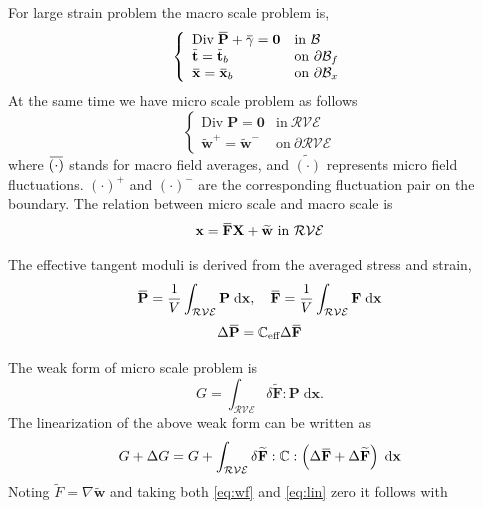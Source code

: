 \documentclass[10pt,a4paper]{scrreprt}
\newcommand{\myd}{\;\mathrm{d}}
\newcommand{\overbar}[1]{\mkern 1.5mu\overline{\mkern-1.5mu#1\mkern-1.5mu}\mkern 1.5mu}
\begin{document}
For large strain problem the macro scale problem is, 
\begin{equation}
\label{eq:macro}
\left\{
\begin{array}{ll}
\textrm{Div} \; \overbar{\mathbf{P}} + \overbar{\mathbf{\gamma}} = \mathbf{0} & \text{in} \ \mathcal{B} \\
\overbar{\mathbf{t}} = \overbar{\mathbf{t}}_{b} & \text{on} \ \partial \mathcal{B}_{f} 
\\
\overbar{\mathbf{x}} = \overbar{\mathbf{x}}_{b} & \text{on} \ \partial \mathcal{B}_{x} 
\end{array}
\right.
\end{equation}
At the same time we have micro scale problem as follows
\begin{equation}
\left\{
\begin{array}{ll}
\textrm{Div} \; \mathbf{P} = \mathbf{0} & \text{in} \ \mathcal{RVE} \\
\widetilde{\mathbf{w}}^{+} = \widetilde{\mathbf{w}}^{-} & \text{on} \ \partial \mathcal{RVE} 
\end{array}
\right.
\end{equation}
where $\overbar{(\cdot)}$ stands for macro field averages, and $\widetilde{(\cdot)}$ represents micro field fluctuations. $(\cdot)^{+}$ and $(\cdot)^{-}$ are the corresponding fluctuation pair on the boundary. The relation between micro scale and macro scale is 
\begin{equation}
\mathbf{x} = \overbar{\mathbf{F}} \mathbf{X} + \widetilde{\mathbf{w}} \ \text{in} \ \mathcal{RVE}
\end{equation}

The effective tangent moduli is derived from the averaged stress and strain,
\begin{equation}
\label{eq:avg}
\overbar{\mathbf{P}} = \dfrac{1}{V} \int_{\mathcal{RVE}} \mathbf{P} \myd{\mathbf{x}}, \quad 
\overbar{\mathbf{F}} = \dfrac{1}{V} \int_{\mathcal{RVE}} \mathbf{F} \myd{\mathbf{x}}
\end{equation}
\begin{equation}
\label{eq:mima}
\Delta \overbar{\mathbf{P}} = \mathbb{C}_{\text{eff}} \Delta \overbar{\mathbf{F}} 
\end{equation}

The weak form of micro scale problem is 
\begin{equation}
\label{eq:wf}
G = \int_{\mathcal{RVE}} \delta \widetilde{\mathbf{F}} : \mathbf{P} \myd{\mathbf{x}}.
\end{equation}
The linearization of the above weak form can be written as 
\begin{equation}
\label{eq:lin}
G + \Delta G = G + \int_{\mathcal{RVE}} \delta \widetilde{\mathbf{F}} : \mathbb{C} : \left( \Delta \overbar{\mathbf{F}} + \Delta \widetilde{\mathbf{F}} \right) \myd{\mathbf{x}}
\end{equation}
Noting $\widetilde{F} = \nabla{\widetilde{\mathbf{w}}} $ and taking both \eqref{eq:wf} and \eqref{eq:lin} zero it follows with
\end{document}
